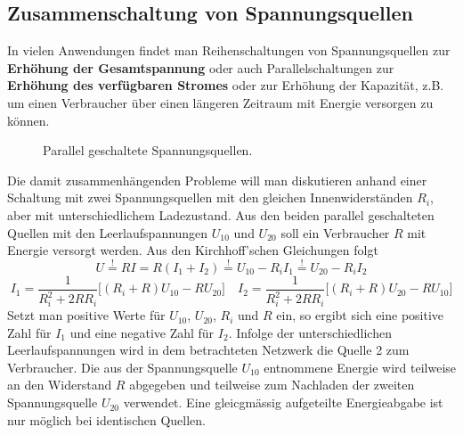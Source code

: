 \subsection{Zusammenschaltung von Spannungsquellen}
In vielen Anwendungen findet man Reihenschaltungen von Spannungsquellen zur \textbf{Erhöhung der Gesamtspannung} oder auch Parallelschaltungen zur \textbf{Erhöhung des verfügbaren Stromes} oder zur Erhöhung der Kapazität, z.B. um einen Verbraucher über einen längeren Zeitraum mit Energie versorgen zu können.
\begin{figure}[H]
\centering
\caption{Parallel geschaltete Spannungsquellen.}
\label{fig_IIIy}
\end{figure}
\noindent Die damit zusammenhängenden Probleme will man diskutieren anhand einer Schaltung mit zwei Spannungsquellen mit den gleichen Innenwiderständen $R_i$, aber mit unterschiedlichem Ladezustand. Aus den beiden parallel geschalteten Quellen mit den Leerlaufspannungen $U_{10}$ und $U_{20}$ soll ein Verbraucher $R$ mit Energie versorgt werden. Aus den Kirchhoff'schen Gleichungen folgt
\begin{equation}
\boxed{U\stackrel{!}{=}RI=R\left(I_1+I_2\right)\stackrel{!}{=}U_{10}-R_iI_1\stackrel{!}{=}U_{20}-R_iI_2}
\end{equation}
\begin{equation}
\boxed{I_1=\dfrac{1}{R_i^2+2RR_i}\Big[\left(R_i+R\right)U_{10}-RU_{20}\Big]}
\quad
\boxed{I_2=\dfrac{1}{R_i^2+2RR_i}\Big[\left(R_i+R\right)U_{20}-RU_{10}\Big]}
\end{equation}
Setzt man positive Werte für $U_{10}$, $U_{20}$, $R_i$ und $R$ ein, so ergibt sich eine positive Zahl für $I_1$ und eine negative Zahl für $I_2$. Infolge der unterschiedlichen Leerlaufspannungen wird in dem betrachteten Netzwerk die Quelle 2 zum Verbraucher. Die aus der Spannungsquelle $U_{10}$ entnommene Energie wird teilweise an den Widerstand $R$ abgegeben und teilweise zum Nachladen der zweiten Spannungsquelle $U_{20}$ verwendet. Eine gleicgmässig aufgeteilte Energieabgabe ist nur möglich bei identischen Quellen.
